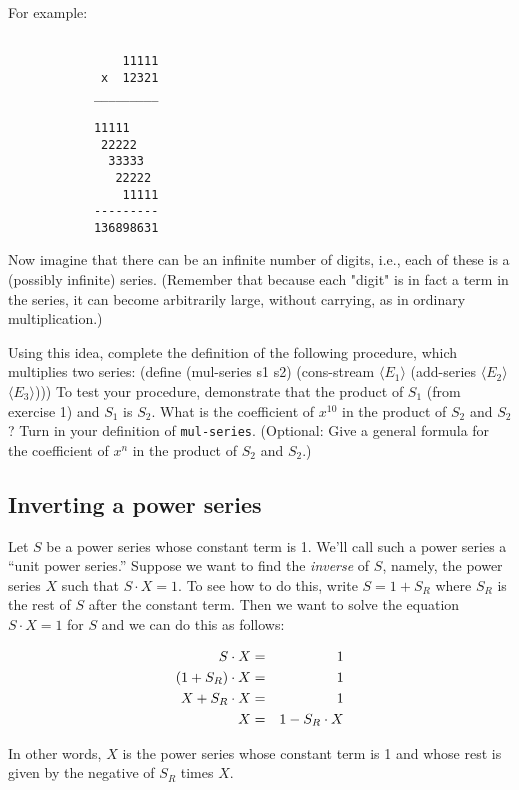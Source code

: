 For example:

\begin{verbatim}

                11111
             x  12321
            _________

            11111
             22222
              33333
               22222
                11111
            ---------
            136898631

\end{verbatim}

Now imagine that there can be an infinite number of digits, i.e., each of 
these is a (possibly infinite) series.  (Remember that because each "digit" 
is in fact a term in the series, it can become arbitrarily large, without
carrying, as in ordinary multiplication.)

Using this idea, complete the definition of the following procedure,
which multiplies two series:
\beginlisp
(define (mul-series s1 s2)
  (cons-stream $\langle E_1 \rangle$
               (add-series $\langle E_2 \rangle$
                           $\langle E_3 \rangle$)))
\endlisp
To test your procedure, demonstrate that the product of $S_1$ (from
exercise 1) and $S_1$ is $S_2$.  What is the coefficient of
$x^{10}$ in the product of $S_2$ and $S_2$?  Turn in your definition of
{\tt mul-series}.  (Optional: Give a general formula for the
coefficient of $x^n$ in the product of $S_2$ and $S_2$.)

\subsection*{Inverting a power series}

Let $S$ be a power series whose constant term is 1.  We'll call such a
power series a ``unit power series.''  Suppose we want to find the {\em
inverse} of $S$, namely, the power series $X$ such that $S\cdot X= 1$.
To see how to do this, 
write $S=1+S_R$ where $S_R$ is the rest of $S$ after the constant
term.  Then we want to solve the equation $S \cdot X = 1$ for $S$ and
we can do this as follows: 

\begin{eqnarray*}
S \cdot X &=& 1 \cr
(1+S_R)\cdot X &=& 1 \cr
X + S_R \cdot X &=& 1 \cr
X &=& 1 - S_R \cdot X
\end{eqnarray*}

In other words, $X$ is the power series whose constant term is 1 and
whose rest is given by the negative of $S_R$ times $X$.

